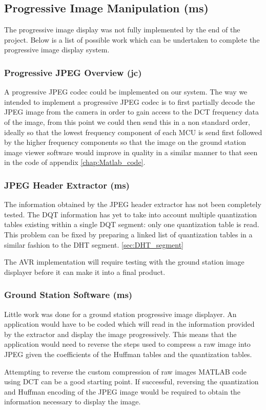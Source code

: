 \subsection{Progressive Image Manipulation (ms)}

The progressive image display was not fully implemented by the end of the project. Below is a list of possible work which can be undertaken to complete the progressive image display system.

\subsubsection{Progressive JPEG Overview (jc)}

A progressive JPEG codec could be implemented on our system. The way we intended to implement a progressive JPEG codec is to first partially decode the JPEG image from the camera in order to gain access to the DCT frequency data of the image, from this point we could then send this in a non standard order, ideally so that the lowest frequency component of each MCU is send first followed by the higher frequency components so that the image on the ground station image viewer software would improve in quality in a similar manner to that seen in the code of appendix \ref{chap:Matlab_code}.

\subsubsection{JPEG Header Extractor (ms)}

The information obtained by the JPEG header extractor has not been completely tested. The DQT information has yet to take into account multiple quantization tables existing within a single DQT segment: only one quantization table is read. This problem can be fixed by preparing a linked list of quantization tables in a similar fashion to the DHT segment. \ref{sec:DHT_segment}

The AVR implementation will require testing with the ground station image displayer before it can make it into a final product.

\subsubsection{Ground Station Software (ms)}

Little work was done for a ground station progressive image displayer. An application would have to be coded which will read in the information provided by the extractor and display the image progressively. This means that the application would need to reverse the steps used to compress a raw image into JPEG given the coefficients of the Huffman tables and the quantization tables. 

Attempting to reverse the custom compression of raw images MATLAB code using DCT can be a good starting point. If successful, reversing the quantization and Huffman encoding of the JPEG image would be required to obtain the information necessary to display the image.
